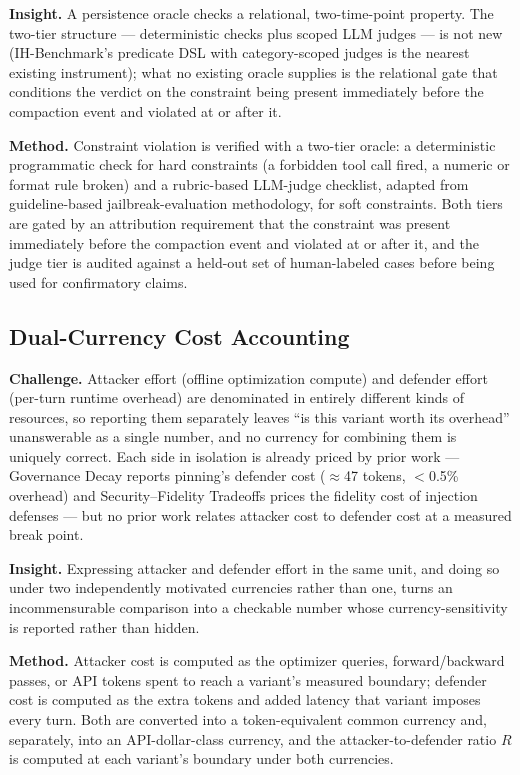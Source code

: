 \documentclass[11pt]{article}
\begin{document}
\textbf{Insight.} A persistence oracle checks a relational, two-time-point property. The two-tier structure --- deterministic checks plus scoped LLM judges --- is not new (IH-Benchmark's predicate DSL with category-scoped judges is the nearest existing instrument); what no existing oracle supplies is the relational gate that conditions the verdict on the constraint being present immediately before the compaction event and violated at or after it.

\textbf{Method.} Constraint violation is verified with a two-tier oracle: a deterministic programmatic check for hard constraints (a forbidden tool call fired, a numeric or format rule broken) and a rubric-based LLM-judge checklist, adapted from guideline-based jailbreak-evaluation methodology, for soft constraints. Both tiers are gated by an attribution requirement that the constraint was present immediately before the compaction event and violated at or after it, and the judge tier is audited against a held-out set of human-labeled cases before being used for confirmatory claims.

\subsection{Dual-Currency Cost Accounting}
\textbf{Challenge.} Attacker effort (offline optimization compute) and defender effort (per-turn runtime overhead) are denominated in entirely different kinds of resources, so reporting them separately leaves ``is this variant worth its overhead'' unanswerable as a single number, and no currency for combining them is uniquely correct. Each side in isolation is already priced by prior work --- Governance Decay reports pinning's defender cost ($\approx$47 tokens, $<$0.5\% overhead) and Security--Fidelity Tradeoffs prices the fidelity cost of injection defenses --- but no prior work relates attacker cost to defender cost at a measured break point.

\textbf{Insight.} Expressing attacker and defender effort in the same unit, and doing so under two independently motivated currencies rather than one, turns an incommensurable comparison into a checkable number whose currency-sensitivity is reported rather than hidden.

\textbf{Method.} Attacker cost is computed as the optimizer queries, forward/backward passes, or API tokens spent to reach a variant's measured boundary; defender cost is computed as the extra tokens and added latency that variant imposes every turn. Both are converted into a token-equivalent common currency and, separately, into an API-dollar-class currency, and the attacker-to-defender ratio $R$ is computed at each variant's boundary under both currencies.
\end{document}
